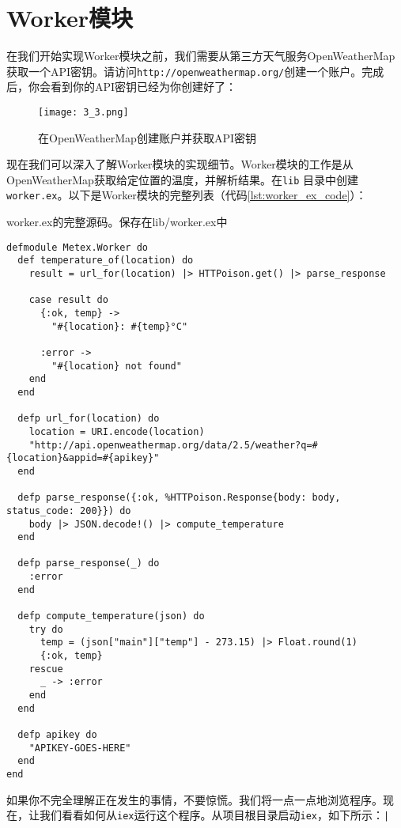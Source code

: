 \section{Worker模块}

在我们开始实现Worker模块之前，我们需要从第三方天气服务OpenWeatherMap获取一个API密钥。请访问\texttt{http://openweathermap.org/}创建一个账户。完成后，你会看到你的API密钥已经为你创建好了：

\begin{figure}[!ht]
    \centering
    \texttt{[image: 3\_3.png]}
    \caption{在OpenWeatherMap创建账户并获取API密钥}
    \label{fig:3_3}
\end{figure}


现在我们可以深入了解Worker模块的实现细节。Worker模块的工作是从OpenWeatherMap获取给定位置的温度，并解析结果。在\texttt{lib} 目录中创建
\texttt{worker.ex}。以下是Worker模块的完整列表（代码\ref{lst:worker_ex_code}）：


\begin{code}{worker.ex的完整源码。保存在lib/worker.ex中}
\begin{verbatim}
defmodule Metex.Worker do
  def temperature_of(location) do
    result = url_for(location) |> HTTPoison.get() |> parse_response

    case result do
      {:ok, temp} ->
        "#{location}: #{temp}°C"

      :error ->
        "#{location} not found"
    end
  end

  defp url_for(location) do
    location = URI.encode(location)
    "http://api.openweathermap.org/data/2.5/weather?q=#{location}&appid=#{apikey}"
  end

  defp parse_response({:ok, %HTTPoison.Response{body: body, status_code: 200}}) do
    body |> JSON.decode!() |> compute_temperature
  end

  defp parse_response(_) do
    :error
  end

  defp compute_temperature(json) do
    try do
      temp = (json["main"]["temp"] - 273.15) |> Float.round(1)
      {:ok, temp}
    rescue
      _ -> :error
    end
  end

  defp apikey do
    "APIKEY-GOES-HERE"
  end
end
\end{verbatim}
\label{lst:worker_ex_code}
\end{code}

如果你不完全理解正在发生的事情，不要惊慌。我们将一点一点地浏览程序。现在，让我们看看如何从\texttt{iex}运行这个程序。从项目根目录启动\texttt{iex}，如下所示：\texttt|%

